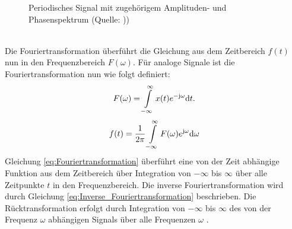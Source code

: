 \begin{figure}[!ht]
	\centering
	\hspace{5mm}
	\caption{Periodisches Signal mit zugehörigem Amplituden- und Phasenspektrum (Quelle: \cite{Eichler.2006}))}
	\label{fig.Fourier}
\end{figure}
\\
Die Fouriertransformation überführt die Gleichung aus dem Zeitbereich $f(t)$ nun in den Frequenzbereich $F(\omega)$. Für analoge Signale ist die Fouriertransformation nun wie folgt definiert:
\begin{equation}
	\label{eq:Fouriertransformation}
	F(\omega) = \int\limits_{-\infty}^{\infty} x(t) e^{\mathrm{-j\omega}} {\mathrm{d}}t.
\end{equation}
\begin{equation}
	\label{eq:Inverse_Fouriertransformation}
	f(t) = \frac{1}{2\pi}\int\limits_{-\infty}^{\infty} F(\omega)e^{\mathrm{j\omega}} {\mathrm{d}}\omega
\end{equation}
Gleichung \ref{eq:Fouriertransformation} überführt eine von der Zeit abhängige Funktion aus dem Zeitbereich über Integration von $-\infty$ bis $\infty$ über alle Zeitpunkte $t$ in den Frequenzbereich. Die inverse Fouriertransformation wird durch Gleichung \ref{eq:Inverse_Fouriertransformation} beschrieben. Die Rücktransformation erfolgt durch Integration von $-\infty$ bis $\infty$ des von der Frequenz $\omega$ abhängigen Signals über alle Frequenzen $\omega$ \cite{Eichler.2006}.

